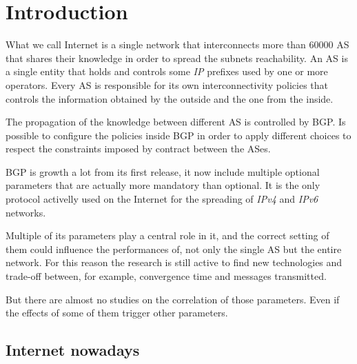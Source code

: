\chapter{Introduction}
\label{cha:introduction}



What we call Internet is a single network that interconnects more than \num{60000}
\ac{AS} that shares their knowledge in order to spread the subnets reachability.
An \ac{AS} is a single entity that holds and controls some \textit{IP} prefixes
used by one or more operators.
Every \ac{AS} is responsible for its own interconnectivity policies that controls
the information obtained by the outside and the one from the inside.

The propagation of the knowledge between different \ac{AS} is controlled by 
\ac{BGP}. 
Is possible to configure the policies inside \ac{BGP} in order to apply different
choices to respect the constraints imposed by contract between the \ac{AS}es.

\ac{BGP} is growth a lot from its first release, it now include multiple optional
parameters that are actually more mandatory than optional.
It is the only protocol activelly used on the Internet for the spreading 
of \textit{IPv4} and \textit{IPv6} networks.

Multiple of its parameters play a central role in it, and the correct setting
of them could influence the performances of, not only the single \ac{AS} but
the entire network.
For this reason the research is still active to find new technologies and
trade-off between, for example, convergence time and messages transmitted.

But there are almost no studies on the correlation of those parameters.
Even if the effects of some of them trigger other parameters.


\section{Internet nowadays}
\label{sec:internet_today}

